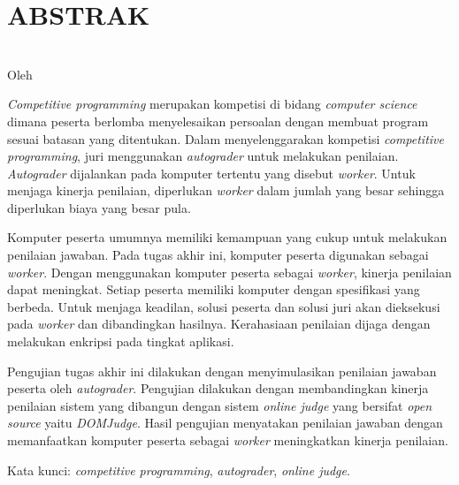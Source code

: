 \clearpage

\chapter*{\uppercase{Abstrak}}

\begin{center}
    \textbf{\large {\MakeUppercase{\thetitle}}} \\
    \normalsize Oleh \theauthor
\end{center}

\singlespacing
\par \textit{Competitive programming} merupakan kompetisi di bidang \textit{computer science} dimana peserta berlomba menyelesaikan persoalan dengan membuat program sesuai batasan yang ditentukan. Dalam menyelenggarakan kompetisi \textit{competitive programming}, juri menggunakan \textit{autograder} untuk melakukan penilaian. \textit{Autograder} dijalankan pada komputer tertentu yang disebut \textit{worker}. Untuk menjaga kinerja penilaian, diperlukan \textit{worker} dalam jumlah yang besar sehingga diperlukan biaya yang besar pula. 

\par Komputer peserta umumnya memiliki kemampuan yang cukup untuk melakukan penilaian jawaban. Pada tugas akhir ini, komputer peserta digunakan sebagai \textit{worker}. Dengan menggunakan komputer peserta sebagai \textit{worker}, kinerja penilaian dapat meningkat. Setiap peserta memiliki komputer dengan spesifikasi yang berbeda. Untuk menjaga keadilan, solusi peserta dan solusi juri akan dieksekusi pada \textit{worker} dan dibandingkan hasilnya. Kerahasiaan penilaian dijaga dengan melakukan enkripsi pada tingkat aplikasi.

\par Pengujian tugas akhir ini dilakukan dengan menyimulasikan penilaian jawaban peserta oleh \textit{autograder}. Pengujian dilakukan dengan membandingkan kinerja penilaian sistem yang dibangun dengan sistem \textit{online judge} yang bersifat \textit{open source} yaitu \textit{DOMJudge}. Hasil pengujian menyatakan penilaian jawaban dengan memanfaatkan komputer peserta sebagai \textit{worker} meningkatkan kinerja penilaian.

\par Kata kunci: \textit{competitive programming}, \textit{autograder}, \textit{online judge}.

\clearpage
\onehalfspacing